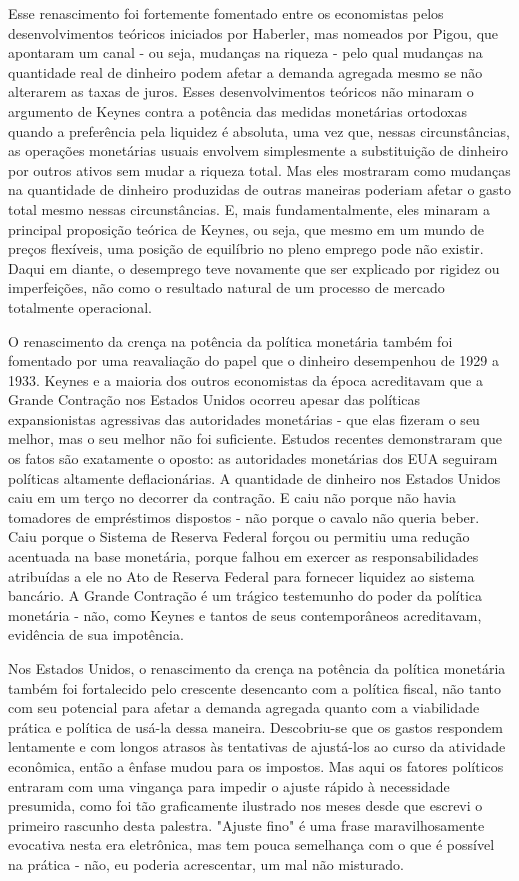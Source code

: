 \documentclass[a4paper,12pt]{article}[abntex2]
\begin{document}
Esse renascimento foi fortemente fomentado entre os economistas pelos desenvolvimentos teóricos iniciados por Haberler, mas nomeados por Pigou, que apontaram um canal - ou seja, mudanças na riqueza - pelo qual mudanças na quantidade real de dinheiro podem afetar a demanda agregada mesmo se não alterarem as taxas de juros. Esses desenvolvimentos teóricos não minaram o argumento de Keynes contra a potência das medidas monetárias ortodoxas quando a preferência pela liquidez é absoluta, uma vez que, nessas circunstâncias, as operações monetárias usuais envolvem simplesmente a substituição de dinheiro por outros ativos sem mudar a riqueza total. Mas eles mostraram como mudanças na quantidade de dinheiro produzidas de outras maneiras poderiam afetar o gasto total mesmo nessas circunstâncias. E, mais fundamentalmente, eles minaram a principal proposição teórica de Keynes, ou seja, que mesmo em um mundo de preços flexíveis, uma posição de equilíbrio no pleno emprego pode não existir. Daqui em diante, o desemprego teve novamente que ser explicado por rigidez ou imperfeições, não como o resultado natural de um processo de mercado totalmente operacional.

O renascimento da crença na potência da política monetária também foi fomentado por uma reavaliação do papel que o dinheiro desempenhou de 1929 a 1933. Keynes e a maioria dos outros economistas da época acreditavam que a Grande Contração nos Estados Unidos ocorreu apesar das políticas expansionistas agressivas das autoridades monetárias - que elas fizeram o seu melhor, mas o seu melhor não foi suficiente. Estudos recentes demonstraram que os fatos são exatamente o oposto: as autoridades monetárias dos EUA seguiram políticas altamente deflacionárias. A quantidade de dinheiro nos Estados Unidos caiu em um terço no decorrer da contração. E caiu não porque não havia tomadores de empréstimos dispostos - não porque o cavalo não queria beber. Caiu porque o Sistema de Reserva Federal forçou ou permitiu uma redução acentuada na base monetária, porque falhou em exercer as responsabilidades atribuídas a ele no Ato de Reserva Federal para fornecer liquidez ao sistema bancário. A Grande Contração é um trágico testemunho do poder da política monetária - não, como Keynes e tantos de seus contemporâneos acreditavam, evidência de sua impotência.

Nos Estados Unidos, o renascimento da crença na potência da política monetária também foi fortalecido pelo crescente desencanto com a política fiscal, não tanto com seu potencial para afetar a demanda agregada quanto com a viabilidade prática e política de usá-la dessa maneira. Descobriu-se que os gastos respondem lentamente e com longos atrasos às tentativas de ajustá-los ao curso da atividade econômica, então a ênfase mudou para os impostos. Mas aqui os fatores políticos entraram com uma vingança para impedir o ajuste rápido à necessidade presumida, como foi tão graficamente ilustrado nos meses desde que escrevi o primeiro rascunho desta palestra. "Ajuste fino" é uma frase maravilhosamente evocativa nesta era eletrônica, mas tem pouca semelhança com o que é possível na prática - não, eu poderia acrescentar, um mal não misturado.
\end{document}
